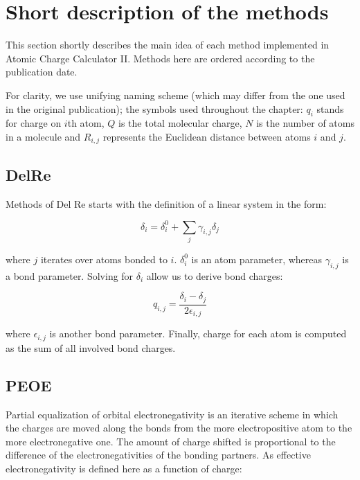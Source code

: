 \documentclass[oneside]{memoir}
\newcommand\ddfrac[2]{\frac{\displaystyle #1}{\displaystyle #2}}
\begin{document}
\chapter*{Short description of the methods}
This section shortly describes the main idea of each method implemented in Atomic Charge Calculator II. Methods here are ordered according to the publication date.

For clarity, we use unifying naming scheme (which may differ from the one used in the original publication); the symbols used throughout the chapter: $q_i$ stands for charge on $i$th atom, $Q$ is the total molecular charge, $N$ is the number of atoms in a molecule and $R_{i, j}$ represents the Euclidean distance between atoms $i$ and $j$.

\section*{DelRe}
\label{sec:methods_delre}
Methods of Del Re \cite{DelRe1958} starts with the definition of a linear system in the form:

\begin{equation}
\label{eq:delre_main}
\delta_i = \delta_i^0 + \sum_{j}\gamma_{i, j}\delta_j
\end{equation}

where $j$ iterates over atoms bonded to $i$. $\delta_i^0$ is an atom parameter, whereas $\gamma_{i, j}$ is a bond parameter. Solving for $\delta_i$ allow us to derive bond charges:

\begin{equation}
\label{eq:delre_bond}
q_{i, j} = \ddfrac{\delta_i - \delta_j}{2\epsilon_{i, j}}
\end{equation}

where $\epsilon_{i, j}$ is another bond parameter. Finally, charge for each atom is computed as the sum of all involved bond charges. 

\section*{PEOE}
\label{sec:methods_peoe}

Partial equalization of orbital electronegativity \cite{Gasteiger1978, Gasteiger1980} is an iterative scheme in which the charges are moved along the bonds from the more electropositive atom to the more electronegative one. The amount of charge shifted is proportional to the difference of the electronegativities of the bonding partners. As effective electronegativity is defined here as a function of charge:
\end{document}
